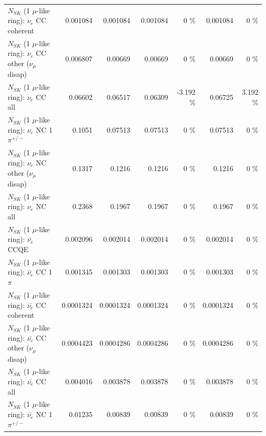 \begin{table}
\begin{tabular}{| l | r | r | r  r | r  r |}
                               $N_{SK}$ (1 $\mu$-like ring): $\nu_e$ CC coherent &        0.001084 &        0.001084 &        0.001084 &        0 \%  &        0.001084 &        0 \%  \\ 
                $N_{SK}$ (1 $\mu$-like ring): $\nu_e$ CC other ($\nu_\mu$ disap) &        0.006807 &         0.00669 &         0.00669 &        0 \%  &         0.00669 &        0 \%  \\ 
                                  $N_{SK}$ (1 $\mu$-like ring): $\nu_{e}$ CC all &         0.06602 &         0.06517 &         0.06309 &   -3.192 \%  &         0.06725 &    3.192 \%  \\ 
\hline
                           $N_{SK}$ (1 $\mu$-like ring): $\nu_e$ NC 1$\pi^{+/-}$ &          0.1051 &         0.07513 &         0.07513 &        0 \%  &         0.07513 &        0 \%  \\ 
                $N_{SK}$ (1 $\mu$-like ring): $\nu_e$ NC other ($\nu_\mu$ disap) &          0.1317 &          0.1216 &          0.1216 &        0 \%  &          0.1216 &        0 \%  \\ 
                                  $N_{SK}$ (1 $\mu$-like ring): $\nu_{e}$ NC all &          0.2368 &          0.1967 &          0.1967 &        0 \%  &          0.1967 &        0 \%  \\ 
\hline
\hline
\hline
                                $N_{SK}$ (1 $\mu$-like ring): $\bar{\nu_e}$ CCQE &        0.002096 &        0.002014 &        0.002014 &        0 \%  &        0.002014 &        0 \%  \\ 
                           $N_{SK}$ (1 $\mu$-like ring): $\bar{\nu_e}$ CC 1$\pi$ &        0.001345 &        0.001303 &        0.001303 &        0 \%  &        0.001303 &        0 \%  \\ 
                         $N_{SK}$ (1 $\mu$-like ring): $\bar{\nu_e}$ CC coherent &       0.0001324 &       0.0001324 &       0.0001324 &        0 \%  &       0.0001324 &        0 \%  \\ 
          $N_{SK}$ (1 $\mu$-like ring): $\bar{\nu_e}$ CC other ($\nu_\mu$ disap) &       0.0004423 &       0.0004286 &       0.0004286 &        0 \%  &       0.0004286 &        0 \%  \\ 
                            $N_{SK}$ (1 $\mu$-like ring): $\bar{\nu_{e}}$ CC all &        0.004016 &        0.003878 &        0.003878 &        0 \%  &        0.003878 &        0 \%  \\ 
\hline
                     $N_{SK}$ (1 $\mu$-like ring): $\bar{\nu_e}$ NC 1$\pi^{+/-}$ &         0.01235 &         0.00839 &         0.00839 &        0 \%  &         0.00839 &        0 \%  \\ 

\end{tabular}
\end{table}
